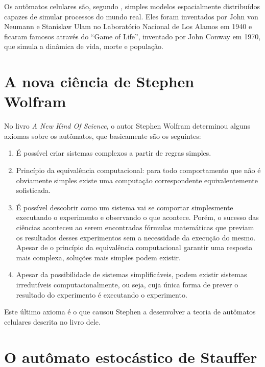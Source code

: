 \documentclass[
	12pt,				%
	openright,			%
	twoside,			%
	a4paper,			%
	english,			%
	french,				%
	spanish,			%
	brazil				%
	]{abntex2}
\begin{document}
Os autômatos celulares são, segundo , simples modelos espacialmente distribuídos capazes de simular processos do mundo real. Eles foram inventados por John von Neumann e Stanislaw Ulam no Laboratório Nacional de Los Alamos em 1940 e ficaram famosos através do ``Game of Life'', inventado por John Conway em 1970, que simula a dinâmica de vida, morte e população.

\section*{A nova ciência de Stephen Wolfram}

No livro \textit{A New Kind Of Science}, o autor Stephen Wolfram \cite{wolfram} determinou alguns axiomas sobre os autômatos, que basicamente são os seguintes:
\begin{enumerate}
	\item É possível criar sistemas complexos a partir de regras simples.
	\item Princípio da equivalência computacional: para todo comportamento que não é obviamente simples  existe uma computação correspondente equivalentemente sofisticada.
	\item É possível descobrir como um sistema vai se comportar simplesmente executando o experimento e observando o que acontece. Porém, o sucesso das ciências aconteceu ao serem encontradas fórmulas matemáticas que previam os resultados desses experimentos sem a necessidade da execução do mesmo. Apesar de o princípio da equivalência computacional garantir uma resposta mais complexa, soluções mais simples podem existir.
	\item Apesar da possibilidade de sistemas simplificáveis, podem existir sistemas irredutíveis computacionalmente, ou seja, cuja única forma de prever o resultado do experimento é executando o experimento.
\end{enumerate}
Este último axioma é o que causou Stephen a desenvolver a teoria de autômatos celulares descrita no livro dele.

\section*{O autômato estocástico de Stauffer}
\end{document}
